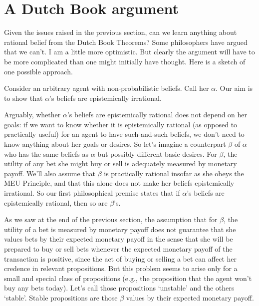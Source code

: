 \section{A Dutch Book argument}

Given the issues raised in the previous section, can we learn anything
about rational belief from the Dutch Book Theorems? Some philosophers
have argued that we can't. I am a little more optimistic. But clearly
the argument will have to be more complicated than one might initially
have thought. Here is a sketch of one possible approach.

Consider an arbitrary agent with non-probabilistic beliefs. Call her
$\alpha$. Our aim is to show that $\alpha$'s beliefs are
epistemically irrational. 

Arguably, whether $\alpha$'s beliefs are epistemically rational does
not depend on her goals: if we want to know whether it is
epistemically rational (as opposed to practically useful) for an agent
to have such-and-such beliefs, we don't need to know anything about
her goals or desires.  So let's imagine a counterpart $\beta$ of
$\alpha$ who has the same beliefs as $\alpha$ but possibly different
basic desires. For $\beta$, the utility of any bet she might buy or
sell is adequately measured by monetary payoff. We'll also assume that
$\beta$ is practically rational insofar as she obeys the MEU
Principle, and that this alone does not make her beliefs epistemically
irrational. So our first philosophical premise states that if
$\alpha$'s beliefs are epistemically rational, then so are $\beta$'s.

As we saw at the end of the previous section, the assumption that for
$\beta$, the utility of a bet is measured by monetary payoff does not
guarantee that she values bets by their expected monetary payoff in
the sense that she will be prepared to buy or sell bets whenever the
expected monetary payoff of the transaction is positive, since the act
of buying or selling a bet can affect her credence in relevant
propositions. But this problem seems to arise only for a small and
special class of propositions (e.g., the proposition that the agent
won't buy any bets today). Let's call those propositions `unstable'
and the others `stable'. Stable propositions are those $\beta$ values
by their expected monetary payoff.


